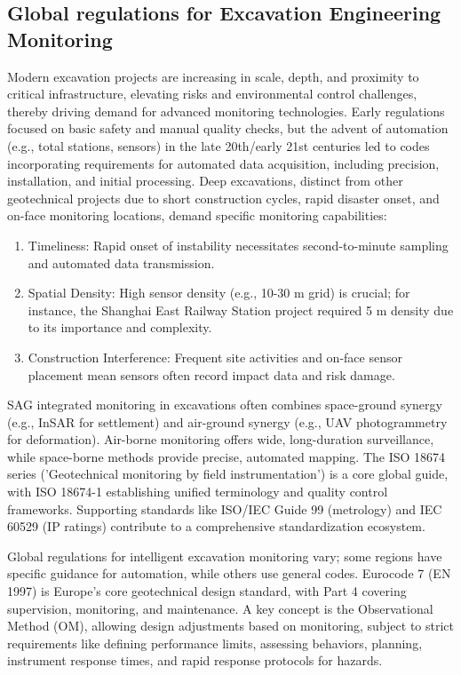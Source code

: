 \documentclass[preprint,11pt,authoryear,3p]{elsarticle}
\begin{document}
\subsection{Global regulations for Excavation Engineering Monitoring}

Modern excavation projects are increasing in scale, depth, and proximity to critical infrastructure, elevating risks and environmental control challenges, thereby driving demand for advanced monitoring technologies. Early regulations focused on basic safety and manual quality checks, but the advent of automation (e.g., total stations, sensors) in the late 20th/early 21st centuries led to codes incorporating requirements for automated data acquisition, including precision, installation, and initial processing. Deep excavations, distinct from other geotechnical projects due to short construction cycles, rapid disaster onset, and on-face monitoring locations, demand specific monitoring capabilities:

\begin{enumerate}
    \item Timeliness: Rapid onset of instability necessitates second-to-minute sampling and automated data transmission.
    \item Spatial Density: High sensor density (e.g., 10-30 m grid) is crucial; for instance, the Shanghai East Railway Station project required 5 m density due to its importance and complexity.
    \item Construction Interference: Frequent site activities and on-face sensor placement mean sensors often record impact data and risk damage.
\end{enumerate}

SAG integrated monitoring in excavations often combines space-ground synergy (e.g., InSAR for settlement) and air-ground synergy (e.g., UAV photogrammetry for deformation). Air-borne monitoring offers wide, long-duration surveillance, while space-borne methods provide precise, automated mapping. The ISO 18674 series ('Geotechnical monitoring by field instrumentation') \citep{ISO18674-1:2015,ISO18674-1:2015,ISO18674-2:2016,ISO18674-3:2017} is a core global guide, with ISO 18674-1 establishing unified terminology and quality control frameworks. Supporting standards like ISO/IEC Guide 99 \citep{JCGM200:2012} (metrology) and IEC 60529 \citep{IEC60529:2013} (IP ratings) contribute to a comprehensive standardization ecosystem.

Global regulations for intelligent excavation monitoring vary; some regions have specific guidance for automation, while others use general codes. Eurocode 7 (EN 1997) \citep{EN1997-1:2024} is Europe's core geotechnical design standard, with Part 4 covering supervision, monitoring, and maintenance. A key concept is the Observational Method (OM), allowing design adjustments based on monitoring, subject to strict requirements like defining performance limits, assessing behaviors, planning, instrument response times, and rapid response protocols for hazards.
\end{document}
